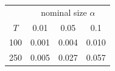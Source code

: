 % 
\begin{tabular}{cccc}
  \hline
  & \multicolumn{3}{c}{nominal size $\alpha$} \\
 $T$ & 0.01 & 0.05 & 0.1 \\
 \hline
100 & 0.001 & 0.004 & 0.010 \\ 
  250 & 0.005 & 0.027 & 0.057 \\ 
   \hline
\end{tabular}
